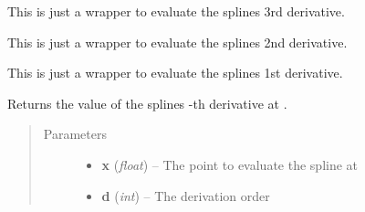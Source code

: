 \documentclass[letterpaper,10pt,english]{sphinxmanual}
\begin{document}
\begin{fulllineitems}
\begin{fulllineitems}
\label{pytrajectory:pytrajectory.spline.CubicSpline.dddf}
This is just a wrapper to evaluate the splines 3rd derivative.

\end{fulllineitems}


\begin{fulllineitems}
\label{pytrajectory:pytrajectory.spline.CubicSpline.ddf}
This is just a wrapper to evaluate the splines 2nd derivative.

\end{fulllineitems}


\begin{fulllineitems}
\label{pytrajectory:pytrajectory.spline.CubicSpline.df}
This is just a wrapper to evaluate the splines 1st derivative.

\end{fulllineitems}


\begin{fulllineitems}
\label{pytrajectory:pytrajectory.spline.CubicSpline.evalf}
Returns the value of the splines -th derivative at .
\begin{quote}\begin{description}
\item[{Parameters}] \leavevmode\begin{itemize}
\item {} 
\textbf{x} (\emph{float}) -- The point to evaluate the spline at

\item {} 
\textbf{d} (\emph{int}) -- The derivation order

\end{itemize}

\end{description}\end{quote}

\end{fulllineitems}



\end{fulllineitems}
\end{document}
